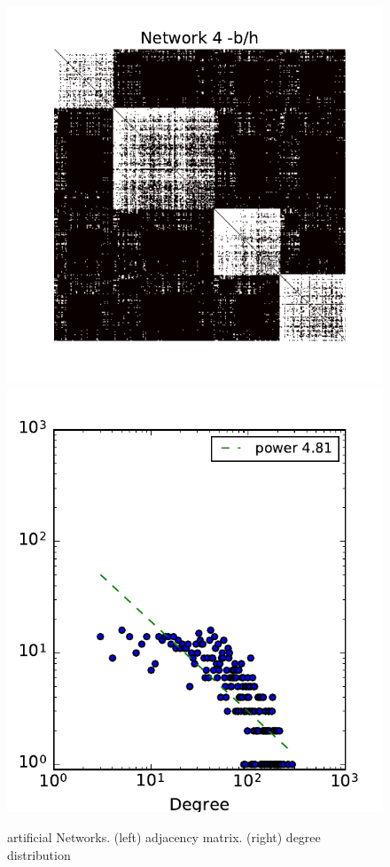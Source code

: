 \begin{figure}[h]
	\endminipage
	\vspace{-0.4cm}
	\includegraphics[scale=0.4]{img/g4}
	\endminipage
	\includegraphics[scale=0.4]{img/g4_d}
	\endminipage
	
	\caption{artificial Networks. (left) adjacency matrix. (right) degree distribution}
	\label{fig:synt_graph}
\end{figure}



